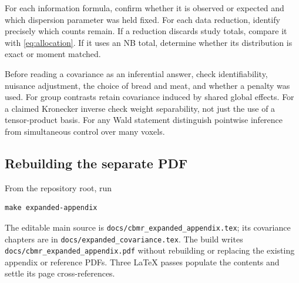\documentclass[11pt,a4paper]{article}
\numberwithin{equation}{section}
\begin{document}
For each information formula, confirm whether it is observed or
expected and which dispersion parameter was held fixed.
For each data reduction, identify precisely which counts remain.
If a reduction discards study totals, compare it with
\eqref{eq:allocation}. If it uses an NB total, determine whether its
distribution is exact or moment matched.

Before reading a covariance as an inferential answer, check
identifiability, nuisance adjustment, the choice of bread and meat,
and whether a penalty was used.
For group contrasts retain covariance induced by shared global effects.
For a claimed Kronecker inverse check weight separability, not just
the use of a tensor-product basis.
For any Wald statement distinguish pointwise inference from simultaneous
control over many voxels.

\subsection{Rebuilding the separate PDF}
From the repository root, run
\begin{verbatim}
make expanded-appendix
\end{verbatim}
The editable main source is \texttt{docs/cbmr\_expanded\_appendix.tex};
its covariance chapters are in \texttt{docs/expanded\_covariance.tex}.
The build writes \texttt{docs/cbmr\_expanded\_appendix.pdf}
without rebuilding or replacing the existing appendix or reference PDFs.
Three LaTeX passes populate the contents and settle its page cross-references.
\end{document}
